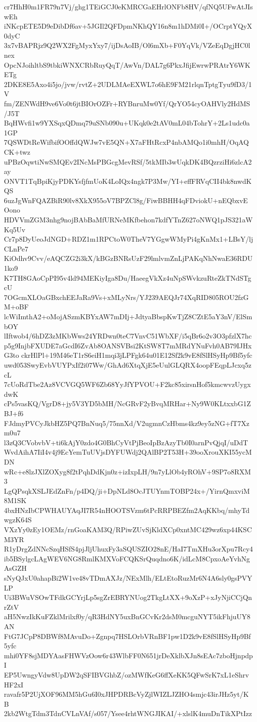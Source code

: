 cr7HhH0m1FR79n7Vj/ghg1TEiGCJ0eKMRCGaEHrlONFb8HV/qfNQ5UFwAtJIswEh
iNKcpETE5D9eDibDf6av+5JGIl2QFDpmNKhQY16n8m1hDMi0I+/OCrptYQyX0dyC
3x7vBAPRjz9Q2WX2FgMyxYxy7/ijDsAoIB/Ol6mXb+F0YqVk/VZeEqDgjHC0lnex
OpcNJoihltbS9tbkiWNXCRbRuyQqT/AwVn/DAL7g6PkxJfijEwrwPRAtrY6WKETg
2DKE8E5Axo4i5jo/jvw/rvtZ+2UDLMAeEXWL7o6hE9FM21rlqnTptgTyu9fD3/1V
fm/ZENWdH9ve6Vo0t6jtBIOrOZFr+RYBnruMw0Yf/QrYO54cyOAHVly2HdMS/J5T
BqHWvfi1w9YXSqxQDmq79uSNb090u+UKqk0e2tAV0mL04bTohrY+2Ls1udc0a1GP
7QSWDtReWifbifOOffdQWJw7vE5QN+X7aFHtRcxP4nbAMQo1i0mhH/OqAQCK+twz
uPBzOqwtiNwSMQEv2INcMsPBGcgMevRSf/5tkMIb3wUqkDK4BQzrziHi6zlcA2ay
ONVT1TqBpiKjyPDKYsfjfmUoK4LoIQx4ngk7P3Mw/YI+effFRVqCII4bk8nwdKQS
6uzJgWnFQAZBiR90lv8XkX955oV7BPZCl8g/FiwBBHH4qFDviokU+nEQbxvEOono
HDVVmZGM3nhg9nojBAbBaMfURNeMKfbehon7kdfYTnZ627oNWQ1pJS321aWKq5Uv
Cr7p8DyUeoJdNGD+RDZ1m1RPCtoW0TheV7YGgwWMyPi4gKnMx1+LBsY/ljCLnPe7
KiOdhv9Cvv/eAQCZG2i3kX/kBGzBNRsUzF29lmlvmZnLjPAKqNhNwaE36RDU1ko9
K7TH8GAoCpPI95v4ld94MEKiyIga8Du/HaeegVkXz4uNpSWvkzuRteZkTNdSTgcU
7OGcmXLOaGBxchEEJaRa9Vs+xMLyNrs/YJ239AEQJr74XqRID805ROU2fzGM+oBF
lcWiImthA2+oMojASzmKBYxAW7mDIj+JdtyaBbspKwTjZ8CZtE5aY3nV/ElSmbOY
lIftwob4/6hDZ3zMKbWws24YRDwn0teC7VnvC51WbXF/i5qBr6o2v3O3pfzlX7hc
p5g9InjbFXUDE7aGcdI6ZvAb8OANSVBsi2KtSW8T7mMRdYNuFvh0AB79IJHxG3to
ckrHlPl+19M46eT1rS6eiH1mqi3jLPFgk64u01E12Sf2k9vE8fSlHSyHp9Bf5yfc
uwd053SwyEvbVUYPxIf2i07Ww/GhAd6XtqXjE5eUulGLQRX4oopFEqpLJcxq5zcL
7cUoRdTbe2Az8VCVGQ5WF6Zb68YyJfYPVOU+F2kc85xirsnHof5kmcwvzUygxdwK
cPs5vasKQ/VgrD8+jy5V3YD5bMH/NcGRvF2yBvqMRHar+Ny9W0KLtxxbG1ZBJ+f6
FJdmyPVCyJkbHZ5PQ7BnNuq5/75nnXd/V2ugmnCzHbms4kz9ey5zNG+fT7Xzm0u7
l3zQ3CVobvbV+ti6kAjY0zdo4G0BhCyVtPjBeoIpBzAzyTb0I0arnPvQjqI/uDdT
WvdAihA7IiI4v4j9EcYemTuUVjsDYFUWdj2QAlBP2T53H+39ooXrouXKI55ycMDN
wRc+e8lzJXlZOXyg8f2tPqhDdKjn0z+izIxpLH/9n7yLlOb4yROhV+9SP7o8RXM3
LgQPsqkXSLJEdZnFn/p4DQ/ji+DpNLd8OcJTUYnmTOBP24x+/YirnQmxviM8M1SK
4bxHNzIbCPWHAUYAqJI7R54nHOOTSVzm6tPcRRPBEZfm2AqKKbq/mhyTdwgzK64S
VXzYy0zEy1OEMz/rnGoaKAM3Q/RPiwZUvSjKldXCp0xntMC429wz6xp44KSCM3YR
R1yDrgZdNNcSzqHSfS4pjJljUhuxFy3aSQUSZIO28nE/HaI7TmXHu3orXpu7Rcy4
ib5BSylgcLAgWEV6NG8RmlKMXVoFCQKSrQuqdno6K/idLcM8CpxoAeYvhNgAsGZH
sNyQJxU0ahapBi2W1ve48vTDmAXJz/NExMlh/ELtEtoRuzMr6N4A6sly0gsPVYLP
Ui3BWuVSOwTFdkGCYrjLp5sgZrEBRYNUog2TkgLtXX+9oXzP+xJyNjiCCjQnrZtV
aH5NwzIkKuFZklMrilxf0y/qR3HdNY5uxBnGCvKr2dsM0mcguNYT5ikFhjuUY8AN
FtG7JCpP8DBWf8MAvuDo+Zgnpq7HSLOrbVRnBF1pw1D2k9vE8fSlHSyHp9Bf5yfc
mhi0YF8sjMDYAasFHWVzOow6r43WlbFF0N651jrDeXklbXJn8sEAc7zboHjnpdpI
EP5UwngyVdw8UpDW2qSFIBVGhbZ/ozMWfKeG6ffXeKK5QFwSrK7xL1eShrvHF2xI
ravafr5P2UjXOF96MM5hGu6I0xJHPDRBcVyZjlWIZLJZHO4smjc43irJHz5yt/KB
2kb2WtgTdm3TdnCVLnVAf/s057/Ysee4rhtWNGJIKAI/+xlslK4muDnTikXPtIzz
